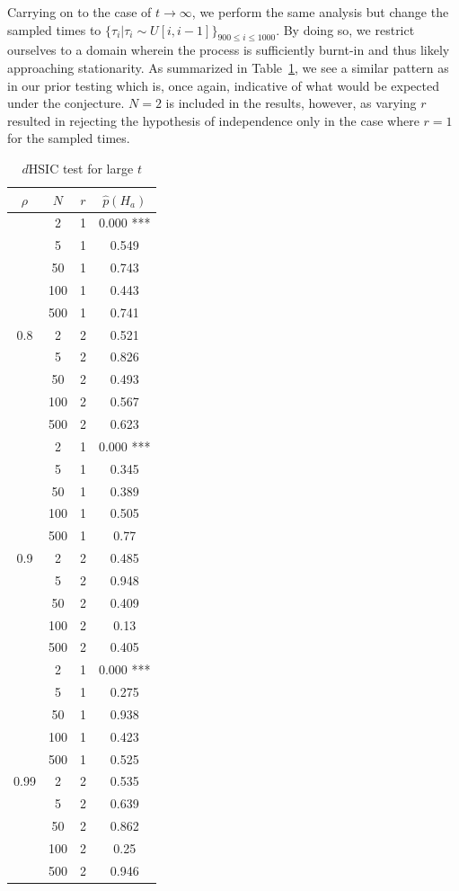 Carrying on to the case of $t \rightarrow \infty$, we perform the same analysis but change the sampled times to
$\{\tau_{i} | \tau_{i} \sim U[i,i-1]\}_{900 \leq i \leq 1000}$.
By doing so, we restrict ourselves to a domain wherein the process is sufficiently burnt-in and thus likely approaching stationarity.
As summarized in Table~\ref{tab:longtime}, we see a similar pattern as in our prior testing which is, once again, indicative
of what would be expected under the conjecture.
$N=2$ is included in the results, however, as varying $r$ resulted in rejecting the hypothesis of independence only in the case where $r=1$ for the sampled times.
\begin{table}
    \centering
    \caption{$d$HSIC test for large $t$}
    \label{tab:longtime}
    \begin{tabular}{|c|c|c|c|}
\hline
$\rho$ & $N$ & $r$ & $\hat p(H_{a})$ \\
\hline
\hline
 & 2 & 1 & 0.000 *** \\
 & 5 & 1 & 0.549  \\
 & 50 & 1 & 0.743  \\
 & 100 & 1 & 0.443  \\
 & 500 & 1 & 0.741  \\
0.8 & 2 & 2 & 0.521  \\
 & 5 & 2 & 0.826  \\
 & 50 & 2 & 0.493  \\
 & 100 & 2 & 0.567  \\
 & 500 & 2 & 0.623  \\
\hline
 & 2 & 1 & 0.000 *** \\
 & 5 & 1 & 0.345  \\
 & 50 & 1 & 0.389  \\
 & 100 & 1 & 0.505  \\
 & 500 & 1 & 0.77  \\
0.9 & 2 & 2 & 0.485  \\
 & 5 & 2 & 0.948  \\
 & 50 & 2 & 0.409  \\
 & 100 & 2 & 0.13  \\
 & 500 & 2 & 0.405  \\
\hline
 & 2 & 1 & 0.000 *** \\
 & 5 & 1 & 0.275  \\
 & 50 & 1 & 0.938  \\
 & 100 & 1 & 0.423  \\
 & 500 & 1 & 0.525  \\
0.99 & 2 & 2 & 0.535  \\
 & 5 & 2 & 0.639  \\
 & 50 & 2 & 0.862  \\
 & 100 & 2 & 0.25  \\
 & 500 & 2 & 0.946  \\
        \hline


\end{tabular}
\end{table}
